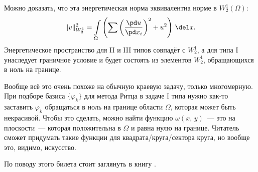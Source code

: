 \documentclass{trlnotes}
\begin{document}
    \begin{rem}
        Можно доказать, что эта энергетическая норма эквивалентна норме в $W_2^1(\Omega)$:
        \[
            \|v\|_{W_2^1}^2 = \int\limits_{\Omega} \left(\sum \left(\dfrac{\pd u}{\pd x_i}\right)^2 + u^2 \right) \, \del x.
        \]
        Энергетическое пространство для II и III типов совпадёт с $W_2^1$, а для типа I унаследует граничное условие и будет состоять из элементов $W_2^1$, обращающихся в ноль на границе.
    \end{rem}

    \begin{rem}
        Вообще всё это очень похоже на обычную краевую задачу, только многомерную. При подборе базиса $\{\varphi_k\}$ для метода Ритца в задаче I типа нужно как-то заставить $\varphi_k$ обращаться в ноль на границе области $\Omega$, которая может быть некрасивой. Чтобы это сделать, можно найти функцию $\omega(x, \, y)$~--- это на плоскости~--- которая положительна в $\Omega$ и равна нулю на границе. Читатель сможет придумать такие функции для квадрата/круга/сектора круга, но вообще это, видимо, искусство.
    \end{rem}

    По поводу этого билета стоит заглянуть в книгу \cite{lebedev}.
\end{document}
